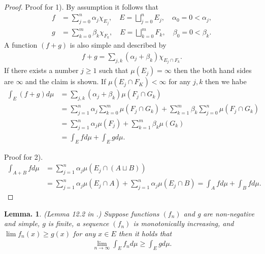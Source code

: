 \documentclass[openany, a4paper, oneside]{book}
\theoremstyle{break}
\newtheorem{lem}[thm]{Lemma.}
\theoremstyle{breakdefn}
\newcommand{\rbk}[1]{\left (#1\right)}
\begin{document}
\begin{proof}
Proof for 1).
By assumption it follows that
\begin{align}
  f
  &=
  \sum_{j=0}^n \alpha_j \chi_{E_j}, \quad
  E
  =
  \bigsqcup_{j=0}^{n} E_j, \quad
  \alpha_0 = 0 < \alpha_j, \\
  g
  &=
  \sum_{k=0}^m \beta_k \chi_{F_k}, \quad
  E
  =
  \bigsqcup_{k=0}^{m} F_k, \quad
  \beta_0 = 0 < \beta_k.
\end{align}
A function $(f+g)$ is also simple and described by
\begin{align}
  f + g
  =
  \sum_{j,k} (\alpha_j + \beta_k) \chi_{E_j \cap F_k}.
\end{align}
If there exists a number $j \geq 1$ such that $\mu (E_j) = \infty$ then
the both hand sides are $\infty$ and the claim is shown.
If $\mu (E_j \cap F_K) < \infty$ for any $j,k$ then we habe
\begin{align}
 \int_E (f+g) d\mu
 &=
 \sum_{j,k} \rbk{\alpha_j + \beta_k} \mu (F_j \cap G_k) \\
 &=
 \sum_{j=1}^n \alpha_j \sum_{k=0}^m \mu (F_j \cap G_k) + \sum_{k=1}^m \beta_k \sum_{j=0}^n \mu (F_j \cap G_k) \\
 &=
 \sum_{j=1}^n \alpha_j \mu (F_j) + \sum_{k=1}^m \beta_k \mu (G_k) \\
 &=
 \int_E f d\mu + \int_E g d\mu.
\end{align}

Proof for 2).
\begin{align}
 \int_{A+B} f d \mu
 &=
 \sum_{j=1}^n \alpha_j \mu \rbk{E_j \cap \rbk{A \sqcup B}} \\
 &=
 \sum_{j=1}^n \alpha_j \mu \rbk{E_j \cap A} + \sum_{j=1}^n \alpha_j \mu \rbk{E_j \cap B}
 =
 \int_A f d\mu + \int_B f d\mu.
\end{align}
\end{proof}
\begin{lem}\textup{(Lemma 12.2 in \cite{SeizoIto1}.)}
 Suppose functions $(f_n)$ and g are non-negative and simple, $g$ is finite, a sequence $(f_n)$ is monotonically increasing, and
 $\lim f_n (x) \geq g (x)$ for any $x \in E$ then it holds that
 \begin{align}
  \lim_{n \to \infty} \int_E f_n d \mu
  \geq
  \int_E g d\mu.
 \end{align}
\end{lem}
\end{document}
